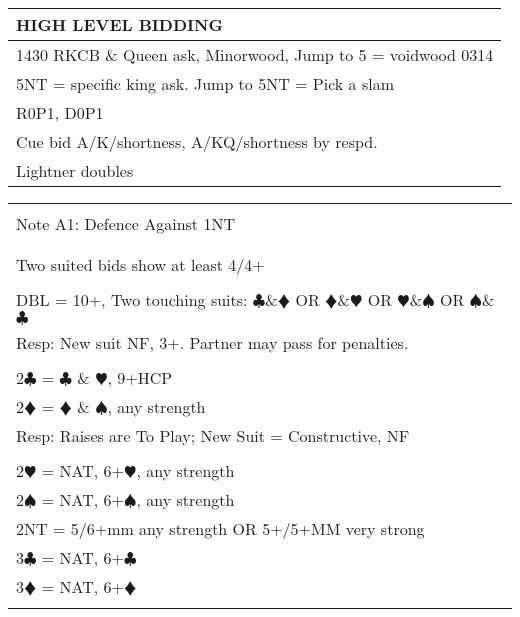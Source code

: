 \documentclass{article}
\newcommand\C{\ensuremath{\clubsuit}}
\newcommand\D{\color{red}\ensuremath{\vardiamondsuit}}
\renewcommand\H{\color{red}\ensuremath{\varheartsuit}}
\renewcommand\S{\ensuremath{\spadesuit}}
\newcommand\N{{\footnotesize NT}}
\begin{document}
\noindent
\begin{tabular}{| p{284mm} |}
	\hline
	\cellcolor{green!25} \textbf{HIGH LEVEL BIDDING}  \\ \hline
	1430 RKCB \& Queen ask, Minorwood, Jump to 5 = voidwood 0314\\ \hline
	5NT = specific king ask. Jump to 5NT = Pick a slam\\ \hline
	R0P1, D0P1 \\ \hline
	Cue bid A/K/shortness, A/KQ/shortness by respd. \\ \hline
	Lightner doubles  \\ \hline

\end{tabular}


\begin{tabular}{|l|}
\hline \\[-1em]
\cellcolor{green!25} \Large Note A1: Defence Against 1NT \\[-1em] 
\\ \hline
\\
\Large Two suited bids show at least 4/4+  \\
\\
\Large DBL = 10+, Two touching suits: {\C}\&{\D} OR {\D}\&{\H} OR {\H}\&{\S} OR {\S}\&{\C} \\ 
\large Resp: New suit NF, 3+. Partner may pass for penalties. \\
\\
\Large 2{\C} = {\C} \& {\H}, 9+HCP \\
\Large 2{\D} = {\D} \& {\S}, any strength  \\
\large Resp: Raises are To Play; New Suit = Constructive, NF \\
\\
\Large 2{\H} = NAT, 6+{\H}, any strength \\
\Large 2{\S} = NAT, 6+{\S}, any strength \\
\Large 2{\N} = 5/6+mm any strength OR 5+/5+MM very strong\\ 
\Large 3{\C} = NAT, 6+{\C} \\
\Large 3{\D} = NAT, 6+{\D} \\
\\ \hline
\end{tabular}
\end{document}
